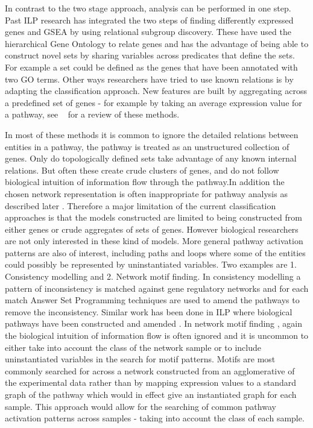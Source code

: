 \documentclass[runningheads,a4paper]{llncs}
\begin{document}
In contrast to the two stage approach, analysis can be performed in one step. Past ILP research \citep{gamberger_induction_2004} has integrated the two steps of finding differently expressed genes and GSEA by using relational subgroup discovery. These have used the hierarchical Gene Ontology to relate genes and has the advantage of being able to construct novel sets by sharing variables across predicates that define the sets. For example a set could be defined as the genes that have been annotated with two GO terms.  Other ways researchers have tried to use known relations is by adapting the classification approach. New features are built by aggregating across a predefined set of genes - for example by taking an average expression value for a pathway, see ~\citep{holec_comparative_2012} for a review of these methods.

In most of these methods it is common to ignore the detailed relations between entities in a pathway, the pathway is treated as an unstructured collection of genes. Only do topologically defined sets take advantage of any known internal relations. But often these create crude clusters of genes, and do not follow biological intuition of information flow through the pathway.In addition the chosen network representation is often inappropriate for pathway analysis as described later . Therefore a major limitation of the current classification approaches is that the models constructed are limited to being constructed from either genes or crude aggregates of sets of genes. However biological researchers are not only interested in these kind of models. More general pathway activation patterns are also of interest, including paths and loops where some of the entities could possibly be represented by uninstantiated variables. Two examples are 1. Consistency modelling and 2. Network motif finding. In consistency modelling \citep{guziolowski2010analysis} a pattern of inconsistency is matched against gene regulatory networks and for each match Answer Set Programming techniques are used to amend the pathways to remove the inconsistency. Similar work has been done in ILP  where biological pathways have been constructed and amended \citep{ray2010automatic}. In network motif finding \citep{kim_biological_2011}, again the biological intuition of information flow is often ignored and it is uncommon to either take into account the class of the network sample or to include uninstantiated variables in the search for motif patterns. Motifs are most commonly searched for across a network constructed from an agglomerative of the experimental data rather than by mapping expression values to a standard graph of the pathway which would in effect give an instantiated graph for each sample. This approach would allow for the searching of common pathway activation patterns across samples - taking into account the class of each sample. 
\end{document}
